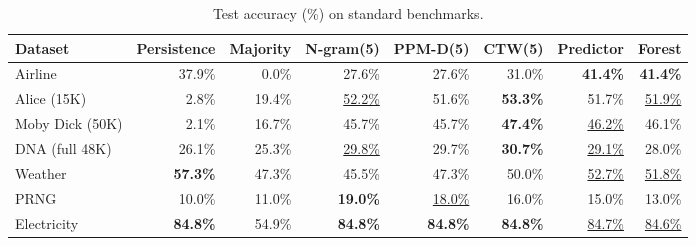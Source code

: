 \begin{table}[h]
\centering
\caption{Test accuracy (\%) on standard benchmarks.}
\label{tab:main_accuracy}
\begin{tabular}{lrrrrrrr}
\toprule
Dataset & Persistence & Majority & N-gram(5) & PPM-D(5) & CTW(5) & Predictor & Forest \\
\midrule
Airline & 37.9\% & 0.0\% & 27.6\% & 27.6\% & 31.0\% & \textbf{41.4\%} & \textbf{41.4\%} \\
Alice (15K) & 2.8\% & 19.4\% & \underline{52.2\%} & 51.6\% & \textbf{53.3\%} & 51.7\% & \underline{51.9\%} \\
Moby Dick (50K) & 2.1\% & 16.7\% & 45.7\% & 45.7\% & \textbf{47.4\%} & \underline{46.2\%} & 46.1\% \\
DNA (full 48K) & 26.1\% & 25.3\% & \underline{29.8\%} & 29.7\% & \textbf{30.7\%} & \underline{29.1\%} & 28.0\% \\
Weather & \textbf{57.3\%} & 47.3\% & 45.5\% & 47.3\% & 50.0\% & \underline{52.7\%} & \underline{51.8\%} \\
PRNG & 10.0\% & 11.0\% & \textbf{19.0\%} & \underline{18.0\%} & 16.0\% & 15.0\% & 13.0\% \\
Electricity & \textbf{84.8\%} & 54.9\% & \textbf{84.8\%} & \textbf{84.8\%} & \textbf{84.8\%} & \underline{84.7\%} & \underline{84.6\%} \\
\bottomrule
\end{tabular}
\end{table}
